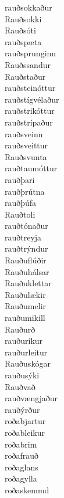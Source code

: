 \documentclass[../samsetningasafn.tex]{subfiles}
\begin{document}
\begin{bigwordlist}
\begin{footnotesize}
\begin{multicols}{4}
\begin{description}
		\item [rauðsokkaður]
		\item [Rauðsokki]
		\item [Rauðsóti]
		\item [rauðspæta]
		\item [rauðsprunginn]
		\item [Rauðssandur]
		\item [Rauðstaður]
		\item [rauðsteinóttur]
		\item [rauðstígvélaður]
		\item [rauðstrikóttur]
		\item [rauðstrípaður]
		\item [rauðsveinn]
		\item [rauðsveittur]
		\item [Rauðsvunta]
		\item [rauðtaumóttur]
		\item [rauðþari]
		\item [rauðþrútna]
		\item [rauðþúfa]
		\item [Rauðtoli]
		\item [rauðtónaður]
		\item [rauðtreyja]
		\item [rauðtrýndur]
		\item [Rauðuflúðir]
		\item [Rauðuhálsar]
		\item [Rauðuklettar]
		\item [Rauðulækir]
		\item [Rauðumelir]
		\item [rauðumikill]
		\item [Rauðurð]
		\item [rauðuríkur]
		\item [rauðurleitur]
		\item [Rauðuskógar]
		\item [rauðusýki]
		\item [Rauðvað]
		\item [rauðvængjaður]
		\item [rauðýrður]
		\item [roðabjartur]
		\item [roðableikur]
		\item [roðabrim]
		\item [roðafrauð]
		\item [roðaglans]
		\item [roðagylla]
		\item [roðaskemmd]

\end{description}
\end{multicols}
\end{footnotesize}
\end{bigwordlist}
\end{document}
